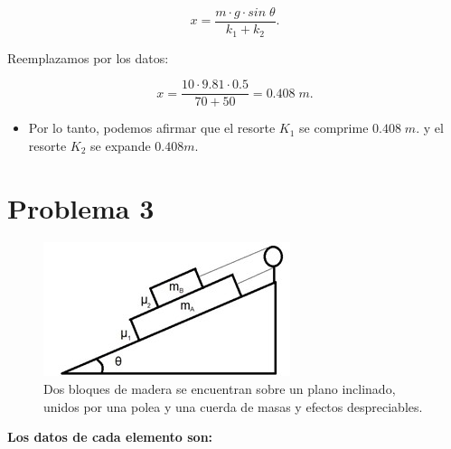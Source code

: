 \documentclass[a4paper,12pt]{article} %
\begin{document}
\begin{center}
    \[{x = \frac{ m \cdot g \cdot sin \; \theta }{k_1 + k_2}}.\]
\end{center}

\begin{justify}
    Reemplazamos por los datos:
\end{justify}

\begin{center}
    \[
    \boxed{x =\frac{10 \cdot 9.81 \cdot 0.5}{70+50} = 0.408 \; m. }
    \]
\end{center}

\begin{itemize}
    \item Por lo tanto, podemos afirmar que el resorte \(K_1\) se comprime \( 0.408 \; m.\) y el resorte \(K_2\) se expande \( 0.408 m.\)
\end{itemize}

\newpage

\newpage

\section*{Problema 3}
\begin{figure}[h!]
    \centering
    \includegraphics[width=\textwidth]{Imagen2.jpg}
    \caption{Dos bloques de madera se encuentran sobre un plano inclinado, unidos por una polea y una cuerda de masas y efectos despreciables.}
\end{figure}

\begin{justify}
    \textbf{Los datos de cada elemento son:}
\end{justify}
\end{document}
